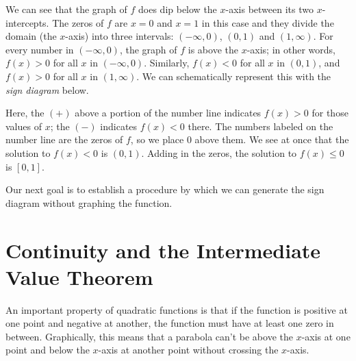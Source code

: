 \documentclass[noauthor, nooutcomes]{ximera}
\begin{document}
We can see that the graph of $f$ does dip below the $x$-axis between its two $x$-intercepts.  The zeros of $f$ are $x=0$ and $x=1$ in this case and they divide the domain (the $x$-axis) into three intervals:  $(-\infty, 0)$, $(0, 1)$ and $(1, \infty)$.  For every number in $(-\infty, 0)$, the graph of $f$ is above the $x$-axis; in other words, $f(x) > 0$ for all $x$ in $(-\infty, 0)$. Similarly, $f(x) < 0$ for all $x$ in $(0,1)$, and $f(x) > 0$ for all $x$ in $(1, \infty)$.  We can schematically represent this with the \emph{sign diagram} below.
\begin{image}
\end{image}

Here, the $(+)$ above a portion of the number line indicates $f(x) > 0$ for those values of $x$; the $(-)$ indicates $f(x) < 0$ there.  The numbers labeled on the number line are the zeros of $f$, so we place $0$ above them.  We see at once that the solution to $f(x) < 0$ is $(0, 1)$. Adding in the zeros, the solution to $f(x) \le 0$ is $[0, 1]$. 

Our next goal is to establish a procedure by which we can generate the sign diagram without graphing the function.

\section{Continuity and the Intermediate Value Theorem}
An important property of quadratic functions is that if the function is positive at one point and negative at another, the function must have at least one zero in between. Graphically, this means that a parabola can't be above the $x$-axis at one point and below the $x$-axis at another point without crossing the $x$-axis. 
\end{document}
